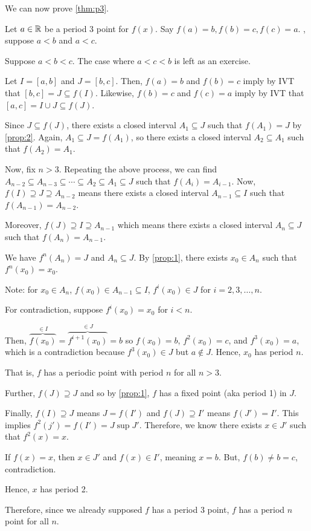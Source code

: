 \documentclass[class=pmath370,tikz,notes]{agony}
\begin{document}
We can now prove \cref{thm:p3}.
\begin{prf}
  Let $a \in \mathbb{R}$ be a period 3 point for $f(x)$. Say $f(a)=b, f(b)=c, f(c)=a$.
  \WLOG, suppose $a < b$ and $a < c$.

  Suppose $a < b < c$. The case where $a < c < b$ is left as an exercise.

  Let $I = [a, b]$ and $J = [b, c]$.
  Then, $f(a)=b$ and $f(b)=c$ imply by IVT that $[b,c] = J \subseteq f(I)$.
  Likewise, $f(b)=c$ and $f(c)=a$ imply by IVT that $[a,c] = I \cup J \subseteq f(J)$.

  Since $J \subseteq f(J)$, there exists a closed interval $A_1 \subseteq J$
  such that $f(A_1) = J$ by \cref{prop:2}.
  Again, $A_1 \subseteq J = f(A_1)$,
  so there exists a closed interval $A_2 \subseteq A_1$ such that $f(A_2)=A_1$.

  Now, fix $n > 3$.
  Repeating the above process,
  we can find $A_{n-2} \subseteq A_{n-3} \subseteq \dotsb \subseteq A_2 \subseteq A_1 \subseteq J$
  such that $f(A_i) = A_{i-1}$.
  Now, $f(I) \supseteq J \supseteq A_{n-2}$ means there exists a closed interval
  $A_{n-1} \subseteq I$ such that $f(A_{n-1}) = A_{n-2}$.

  Moreover, $f(J) \supseteq I \supseteq A_{n-1}$
  which means there exists a closed interval $A_n \subseteq J$
  such that $f(A_n)=A_{n-1}$.

  We have $f^n(A_n)=J$ and $A_n \subseteq J$.
  By \cref{prop:1}, there exists $x_0 \in A_n$ such that $f^n(x_0)=x_0$.

  Note: for $x_0 \in A_n$, $f(x_0) \in A_{n-1} \subseteq I$, $f^i(x_0) \in J$ for $i=2, 3, \dotsc, n$.

  For contradiction, suppose $f^i(x_0)=x_0$ for $i < n$.

  Then, $\overbrace{f(x_0)}^{\in I} = \overbrace{f^{i+1}(x_0)}^{\in J} = b$
  so $f(x_0) = b$, $f^2(x_0)=c$, and $f^3(x_0) = a$,
  which is a contradiction because $f^3(x_0) \in J$ but $a \not\in J$.
  Hence, $x_0$ has period $n$.

  That is, $f$ has a periodic point with period $n$ for all $n > 3$.

  Further, $f(J) \supseteq J$ and so by \cref{prop:1},
  $f$ has a fixed point (aka period 1) in $J$.

  Finally, $f(I) \supseteq J$ means $J=f(I')$ and $f(J) \supseteq I'$ means $f(J')=I'$.
  This implies $f^2(j') = f(I') = J \sup J'$.
  Therefore, we know there exists $x \in J'$ such that $f^2(x)=x$.

  If $f(x)=x$, then $x \in J'$ and $f(x) \in I'$, meaning $x=b$.
  But, $f(b) \neq b = c$, contradiction.

  Hence, $x$ has period 2.

  Therefore, since we already supposed $f$ has a period 3 point,
  $f$ has a period $n$ point for all $n$.
\end{prf}
\end{document}
